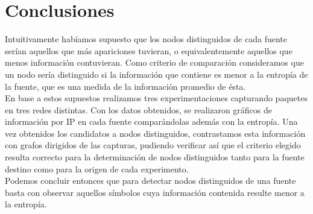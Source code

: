 








\section{Conclusiones}

\indent \indent Intuitivamente habíamos supuesto que los nodos distinguidos de cada fuente serían aquellos que más apariciones tuvieran, o equivalentemente aquellos que menos información contuvieran. Como criterio de comparación consideramos que un nodo sería distinguido si la información que contiene es menor a la entropía de la fuente, que es una medida de la información promedio de ésta.\\
\indent En base a estos supuestos realizamos tres experimentaciones capturando paquetes en tres redes distintas. Con los datos obtenidos, se realizaron gráficos de información por IP en cada fuente comparándolas además con la entropía. Una vez obtenidos los candidatos a nodos distinguidos, contrastamos esta información con grafos dirigidos de las capturas, pudiendo verificar así que el criterio elegido resulta correcto para la determinación de nodos distinguidos tanto para la fuente destino como para la origen de cada experimento.\\
\indent Podemos concluir entonces que para detectar nodos distinguidos de una fuente basta con observar aquellos símbolos cuya información contenida resulte menor a la entropía.\\ 
